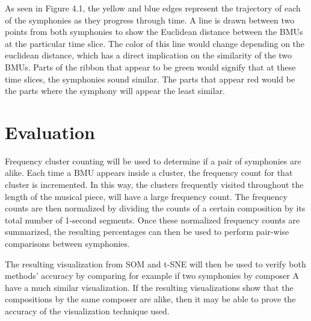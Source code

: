 

As seen in Figure 4.1, the yellow and blue edges represent the trajectory of each of the symphonies as they progress through time. A line is drawn between two points from both symphonies to show the Euclidean distance between the BMUs at the particular time slice. The color of this line would change depending  on the euclidean distance, which has a direct implication on the similarity of the two BMUs. Parts of the ribbon that appear to be green would signify that at these time slices, the symphonies sound similar. The parts that appear red would be the parts where the symphony will appear the least similar.

\section{Evaluation}
Frequency cluster counting will be used to determine if a pair of symphonies are alike. Each time a BMU appears inside a cluster, the frequency count for that cluster is incremented. In this way, the clusters frequently visited throughout the length of the musical piece, will have a large frequency count. The frequency counts are then normalized by dividing the counts of a certain composition by its total number of 1-second segments. Once these normalized frequency counts are summarized, the resulting percentages can then be used to perform pair-wise comparisons between symphonies.

The resulting visualization from SOM and t-SNE will then be used to verify both methods’ accuracy by comparing for example if two symphonies by composer A have a much similar visualization. If the resulting visualizations show that the compositions by the same composer are alike, then it may be able to prove the accuracy of the visualization technique used.